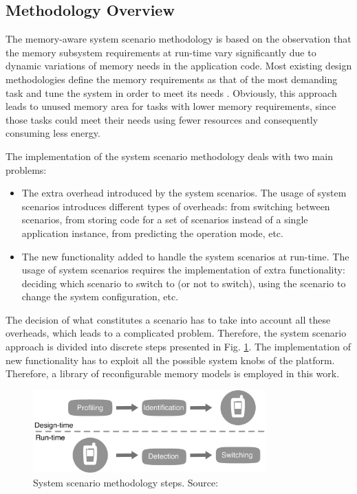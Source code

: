 \subsection{Methodology Overview}

The memory-aware system scenario methodology is based on the observation that the memory subsystem requirements at run-time vary significantly due to dynamic variations of memory needs in the application code. 
Most existing design methodologies define the memory requirements as that of the most demanding task and tune the system in order to meet its needs \cite{tcm}. 
Obviously, this approach leads to unused memory area for tasks with lower memory requirements, since those tasks could meet their needs using fewer resources and consequently consuming less energy. 

The implementation of the system scenario methodology deals with two main problems: 
\begin{itemize}
 \item The extra overhead introduced by the system scenarios. The usage of system scenarios introduces different types of overheads: from switching between scenarios, from storing code for a set of scenarios instead of a single application instance, from predicting the operation mode, etc.
 \item The new functionality added to handle the system scenarios at run-time. The usage of system scenarios requires the implementation of extra functionality: deciding which scenario to switch to (or not to switch), using the scenario to change the system configuration, etc.
\end{itemize}
 
 The decision of what constitutes a scenario has to take into account all these overheads, which leads to a complicated problem. 
 Therefore, the system scenario approach is divided into discrete steps presented in Fig. \ref{fig:overview}.
 The implementation of new functionality has to exploit all the possible system knobs of the platform.
 Therefore, a library of reconfigurable memory models is employed in this work.

\begin{figure}
\centering
	\includegraphics[width=0.8\textwidth]{Images/overview.pdf}
	\caption{System scenario methodology steps. Source: \cite{GheoThesis} }
	\label{fig:overview}
\end{figure}

